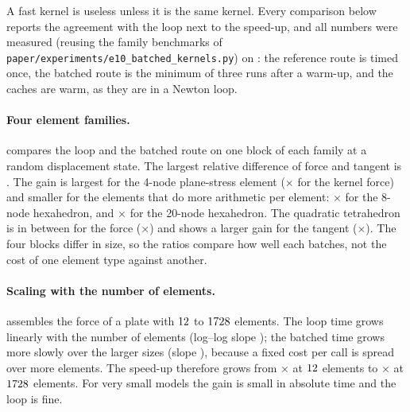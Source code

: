 A fast kernel is useless unless it is the same kernel. Every comparison below reports the agreement with the loop next to the speed-up, and all numbers were measured (reusing the family benchmarks of \texttt{paper/experiments/e10\_batched\_kernels.py}) on \machine{}: the reference route is timed once, the batched route is the minimum of three runs after a warm-up, and the caches are warm, as they are in a Newton loop.

\paragraph{Four element families.}
 compares the loop and the batched route on one block of each family at a random displacement state. The largest relative difference of force and tangent is \cbkAgreeWorst. The gain is largest for the 4-node plane-stress element (\cbkKFQuad$\times$ for the kernel force) and smaller for the elements that do more arithmetic per element: \cbkKFHexEight$\times$ for the 8-node hexahedron, and \cbkKFHexTwenty$\times$ for the 20-node hexahedron. The quadratic tetrahedron is in between for the force (\cbkKFTet$\times$) and shows a larger gain for the tangent (\cbkKTTet$\times$). The four blocks differ in size, so the ratios compare how well each batches, not the cost of one element type against another.

\begin{table}[ht]
\centering\small

\caption{Loop against batched route: speed-up of the element kernels (force, tangent) and of the assembled force of the whole system, and the largest relative difference of the results. One run per family on \machine.}\label{tab:bk-families}
\end{table}

\paragraph{Scaling with the number of elements.}
 assembles the force of a plate with $12$ to $1728$ elements. The loop time grows linearly with the number of elements (log--log slope \cbkLoopSlope); the batched time grows more slowly over the larger sizes (slope \cbkBatchSlope), because a fixed cost per call is spread over more elements. The speed-up therefore grows from \cbkScaleSmall$\times$ at $12$ elements to \cbkScaleLarge$\times$ at $1728$ elements. For very small models the gain is small in absolute time and the loop is fine.

